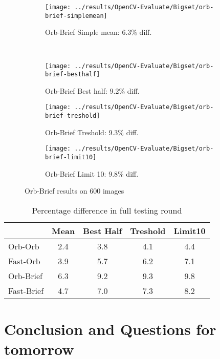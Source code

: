 \documentclass{article}
\begin{document}
\begin{figure}
        \centering
		\begin{subfigure}[b]{0.45\textwidth}
                \centering
				\texttt{[image: ../results/OpenCV-Evaluate/Bigset/orb-brief-simplemean]}
				\caption{Orb-Brief Simple mean: 6.3\% diff.}
				\label{fig:bigset-orb-brief-simplemean}
        \end{subfigure}%
        ~ %
		\begin{subfigure}[b]{0.45\textwidth}
				\centering
				\texttt{[image: ../results/OpenCV-Evaluate/Bigset/orb-brief-besthalf]}
				\caption{Orb-Brief Best half: 9.2\% diff.}
				\label{fig:bigset-orb-brief-besthalf}
		\end{subfigure}


		\begin{subfigure}[b]{0.45\textwidth}
				\centering
				\texttt{[image: ../results/OpenCV-Evaluate/Bigset/orb-brief-treshold]}
				\caption{Orb-Brief Treshold: 9.3\% diff.}
				\label{fig:bigset-orb-brief-treshold}
		\end{subfigure}
%
		\begin{subfigure}[b]{0.45\textwidth}
				\centering
				\texttt{[image: ../results/OpenCV-Evaluate/Bigset/orb-brief-limit10]}
				\caption{Orb-Brief Limit 10: 9.8\% diff.}
				\label{fig:bigset-orb-brief-limit10}
		\end{subfigure}
		\caption{Orb-Brief results on 600 images}\label{fig:bigset}
\end{figure}

\begin{table}[t]
	\centering
	\label{table:bigset}
	\begin{tabular}{l c c c c}
		& Mean & Best Half & Treshold & Limit10 \\
		\hline
		Orb-Orb		& 2.4 & 3.8 & 4.1  & 4.4 \\
		Fast-Orb	& 3.9 & 5.7 & 6.2  & 7.1 \\
		Orb-Brief	& 6.3 & 9.2 & 9.3  & 9.8 \\
		Fast-Brief	& 4.7 & 7.0 & 7.3  & 8.2 \\
	\end{tabular}
	\caption{Percentage difference in full testing round}
\end{table}

\section{Conclusion and Questions for tomorrow}
\end{document}
